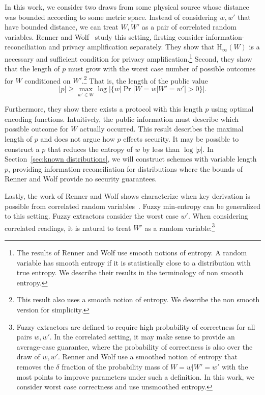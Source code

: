 \documentclass[11pt]{article}
\newcommand{\secref}[1]{\mbox{Section~\ref{#1}}}
\newcommand{\Hoo}{\mathrm{H}_\infty}
\begin{document}
In this work, we consider two draws from some physical source whose distance was bounded according to some metric space.
Instead of considering $w, w'$ that have bounded distance, we can treat $W, W'$ as a pair of correlated random variables.  
  Renner and Wolf~\cite{DBLP:conf/asiacrypt/RennerW05} study this setting, firsting consider information-reconciliation and privacy amplification separately.  They show that $\Hoo(W)$ is a necessary and sufficient condition for privacy amplification.\footnote{The results of Renner and Wolf use smooth notions of entropy.  A random variable has smooth entropy if it is statistically close to a distribution with true entropy. We describe their results in the terminology of non smooth entropy.}  Second, they show that the length of $p$ must grow with the worst case number of possible outcomes for $W$ conditioned on $W'$.\footnote{This result also uses a smooth notion of entropy.  We describe the non smooth version for simplicity.}  That is, the length of the public value \[|p|\ge \max_{w'\in W} \log |\{w | \Pr[W=w | W'=w']>0\}|.\]

Furthermore, they show there exists a protocol with this length $p$ using optimal encoding functions.  Intuitively, the public information must describe which possible outcome for $W$ actually occurred. This result describes the maximal length of $p$ and does not argue how $p$ effects security.  It may be possible to construct a $p$ that reduces the entropy of $w$ by less than $\log |p|$.  In \secref{sec:known distributions}, we will construct schemes with variable length $p$, providing information-reconciliation for distributions where the bounds of Renner and Wolf provide no security guarantees.

Lastly, the work of Renner and Wolf shows characterize when key derivation is possible from correlated random variables~\cite[Theorem 3]{DBLP:conf/asiacrypt/RennerW05}.  Fuzzy min-entropy can be generalized to this setting.   Fuzzy extractors consider the worst case $w'$.  When considering correlated readings, it is natural to treat $W'$ as a random variable:\footnote{Fuzzy extractors are defined to require high probability of correctness for all pairs $w, w'$.  In the correlated setting, it may make sense to provide an average-case guarantee, where the probability of correctness is also over the draw of $w, w'$.  Renner and Wolf use a smoothed notion of entropy that removes the $\delta$ fraction of the probability mass of $W=w|W'=w'$ with the most points to improve parameters under such a definition.  In this work, we consider worst case correctness and use unsmoothed entropy.}
\end{document}
